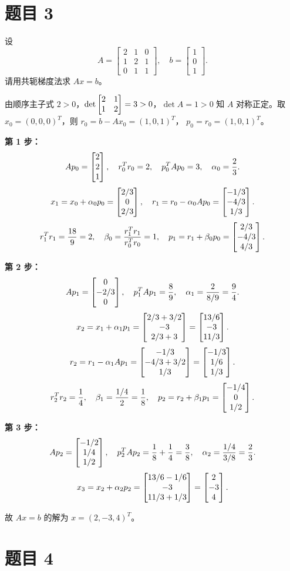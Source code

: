 \documentclass{article}
\begin{document}
\section{题目 3}

设
\[
  A =
  \begin{bmatrix} 2 & 1 & 0 \\ 1 & 2 & 1 \\ 0 & 1 & 1
  \end{bmatrix}, \quad
  b =
  \begin{bmatrix} 1 \\ 0 \\ 1
  \end{bmatrix}.
\]
请用共轭梯度法求 $Ax = b$。

\begin{solution}
  由顺序主子式 $2 > 0$，$\det\begin{bmatrix} 2 & 1 \\ 1 & 2 \end{bmatrix} = 3 > 0$，$\det A = 1 > 0$
  知 $A$ 对称正定。取 $x_0 = (0,0,0)^T$，则 $r_0 = b - Ax_0 = (1,0,1)^T$，
  $p_0 = r_0 = (1,0,1)^T$。

  \textbf{第 1 步：}
  \[
    Ap_0 = \begin{bmatrix} 2 \\ 2 \\ 1 \end{bmatrix}, \quad r_0^T r_0 = 2, \quad p_0^T A p_0 = 3,
    \quad \alpha_0 = \frac{2}{3}.
  \]
  \[
    x_1 = x_0 + \alpha_0 p_0 = \begin{bmatrix} 2/3 \\ 0 \\ 2/3 \end{bmatrix}, \quad
    r_1 = r_0 - \alpha_0 Ap_0 = \begin{bmatrix} -1/3 \\ -4/3 \\ 1/3 \end{bmatrix}.
  \]
  \[
    r_1^T r_1 = \frac{18}{9} = 2, \quad
    \beta_0 = \frac{r_1^T r_1}{r_0^T r_0} = 1, \quad
    p_1 = r_1 + \beta_0 p_0 = \begin{bmatrix} 2/3 \\ -4/3 \\ 4/3 \end{bmatrix}.
  \]

  \textbf{第 2 步：}
  \[
    Ap_1 = \begin{bmatrix} 0 \\ -2/3 \\ 0 \end{bmatrix}, \quad p_1^T Ap_1 = \frac{8}{9}, \quad
    \alpha_1 = \frac{2}{8/9} = \frac{9}{4}.
  \]
  \[
    x_2 = x_1 + \alpha_1 p_1 = \begin{bmatrix} 2/3+3/2 \\ -3 \\ 2/3+3 \end{bmatrix}
    = \begin{bmatrix} 13/6 \\ -3 \\ 11/3 \end{bmatrix}.
  \]
  \[
    r_2 = r_1 - \alpha_1 Ap_1 = \begin{bmatrix} -1/3 \\ -4/3+3/2 \\ 1/3 \end{bmatrix}
    = \begin{bmatrix} -1/3 \\ 1/6 \\ 1/3 \end{bmatrix}.
  \]
  \[
    r_2^T r_2 = \frac{1}{4}, \quad
    \beta_1 = \frac{1/4}{2} = \frac{1}{8}, \quad
    p_2 = r_2 + \beta_1 p_1 = \begin{bmatrix} -1/4 \\ 0 \\ 1/2 \end{bmatrix}.
  \]

  \textbf{第 3 步：}
  \[
    Ap_2 = \begin{bmatrix} -1/2 \\ 1/4 \\ 1/2 \end{bmatrix}, \quad p_2^T Ap_2 =
    \frac{1}{8}+\frac{1}{4} =
    \frac{3}{8}, \quad \alpha_2 = \frac{1/4}{3/8} = \frac{2}{3}.
  \]
  \[
    x_3 = x_2 + \alpha_2 p_2 = \begin{bmatrix} 13/6-1/6 \\ -3 \\ 11/3+1/3 \end{bmatrix}
    = \begin{bmatrix} 2 \\ -3 \\ 4 \end{bmatrix}.
  \]

  故 $Ax = b$ 的解为 $x = (2, -3, 4)^T$。
\end{solution}

\section{题目 4}
\end{document}
